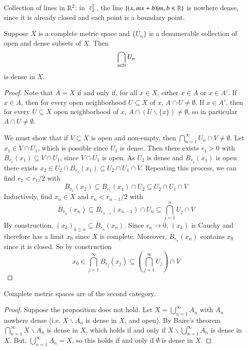 \begin{example}
    Collection of lines in $\mathbb R^2$: in $\ell_2^2$, the line $\{(x,mx+b) \vert m,b \in \mathbb R\}$ is nowhere dense, since it is already closed and each point is a boundary point.
\end{example}

\begin{theorem}[Baire]
    Suppose $X$ is a complete metric space and $\{U_n\}$ is a denumerable collection of open and dense subsets of $X$. Then $$\bigcap_{n\in\mathbb N}U_n$$ is dense in $X$.
\end{theorem}
\begin{proof}
    Note that $\overline{A} = X$ if and only if, for all $x \in X$, either $x \in A$ or $x \in A'$. If $x \in A$, then for every open neighborhood $U \subseteq X$ of $x$, $A \cap U \neq \emptyset$. If $x \in A'$, then for every $U \subseteq X$ open neighborhood of $x$, $A\cap (U\backslash\{x\})\neq \emptyset$, so in particular $A\cap U \neq \emptyset$.

    We must show that if $V \subseteq X$ is open and non-empty, then $\bigcap_{n=1}^{\infty}U_n\cap V \neq \emptyset$. Let $x_1 \in V\cap U_1$, which is possible since $U_1$ is dense. Then there exists $r_1 > 0$ with $\overline{B}_{r_1}(x_1) \subseteq V\cap U_1$, since $V\cap U_1$ is open. As $U_2$ is dense and $B_{r_1}(x_1)$ is open there exists $x_2 \in U_2 \cap B_{r_1}(x_1) \subseteq U_2 \cap U_1 \cap V$. Repeating this process, we can find $r_2 < r_1/2$ with $$\overline{B}_{r_2}(x_2) \subseteq B_{r_1}(x_1)\cap U_2\subseteq U_2\cap U_1\cap V$$ Inductively, find $x_n \in X$ and $r_n < r_{n-1}/2$ with $$\overline{B}_{r_n}(x_n) \subseteq B_{r_{n-1}}(x_{n-1})\cap U_n\subseteq \bigcap_{j=1}^nU_j\cap V$$ By construction, $(x_k)_{k\geq n} \subseteq \overline{B}_{r_n}(x_n)$. Since $r_n\rightarrow 0$, $(x_k)$ is Cauchy and therefore has a limit $x_0$ since $X$ is complete. Moreover, $\overline{B}_{r_n}(x_n)$ contains $x_0$ since it is closed. So by construction $$x_0 \in \bigcap_{j=1}^{\infty}B_{r_j}(x_j) \subseteq \left(\bigcap_{j=1}^{\infty}U_j\right)\cap V$$
\end{proof}


\begin{corollary}
    Complete metric spaces are of the second category.
\end{corollary}
\begin{proof}
    Suppose the proposition does not hold. Let $X = \bigcup_{n=1}^{\infty}A_n$ with $A_n$ nowhere dense (i.e. $X\backslash \overline{A_n}$ is dense in $X$, and open). By Baire's theorem $\bigcap_{n=1}^{\infty}X\backslash \overline{A_n}$ is dense in $X$, which holds if and only if $X\backslash\bigcup_{n=1}^{\infty}\overline{A_n}$ is dense in $X$. But, $\bigcup_{n=1}^{\infty}\overline{A_n} = X$, so this holds if and only if $\emptyset$ is dense in $X$.
\end{proof}

